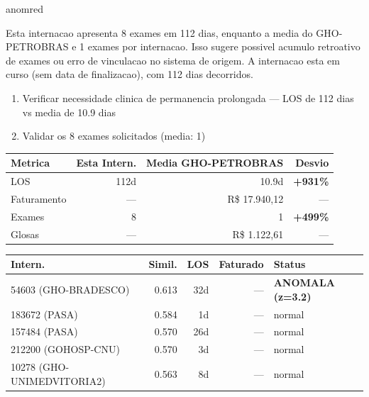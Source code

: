 \documentclass[a4paper,10pt]{article}
\begin{document}
\begin{anomalycard}[Internacao 157279 | GHO-PETROBRAS | CRITICO (z=5.25)]{anomred}
\vspace{2pt}\begin{tcolorbox}[colback=severityred!20,colframe=anomred,title={\textbf{Interpretacao de Negocio}},fonttitle=\bfseries\small,left=4pt,right=4pt,top=3pt,bottom=3pt]
{\small Esta internacao apresenta 8 exames em 112 dias, enquanto a media do GHO-PETROBRAS e 1 exames por internacao. Isso sugere possivel acumulo retroativo de exames ou erro de vinculacao no sistema de origem. A internacao esta em curso (sem data de finalizacao), com 112 dias decorridos.}
\end{tcolorbox}
\begin{tcolorbox}[colback=severityyellow!30,colframe=anomorange,title={\textbf{Recomendacoes Especificas}},fonttitle=\bfseries\small,left=4pt,right=4pt,top=3pt,bottom=3pt]
\begin{enumerate}[nosep,leftmargin=16pt]
\item {\small Verificar necessidade clinica de permanencia prolongada --- LOS de 112 dias vs media de 10.9 dias}
\item {\small Validar os 8 exames solicitados (media: 1)}
\end{enumerate}
\end{tcolorbox}
\begin{center}\begin{tabular}{l r r r}\toprule\textbf{Metrica} & \textbf{Esta Intern.} & \textbf{Media GHO-PETROBRAS} & \textbf{Desvio} \\\midrule
LOS & 112d & 10.9d & \textcolor{anomred}{\textbf{+931\%}} \\
Faturamento & --- & R\$ 17.940,12 & --- \\
Exames & 8 & 1 & \textcolor{anomred}{\textbf{+499\%}} \\
Glosas & --- & R\$ 1.122,61 & --- \\
\bottomrule\end{tabular}\end{center}

\begin{tabular}{l r r r l}\toprule\textbf{Intern.} & \textbf{Simil.} & \textbf{LOS} & \textbf{Faturado} & \textbf{Status} \\\midrule
54603 (GHO-BRADESCO) & 0.613 & 32d & --- & \textcolor{anomred}{\textbf{ANOMALA (z=3.2)}} \\
183672 (PASA) & 0.584 & 1d & --- & \textcolor{jcubeblue}{normal} \\
157484 (PASA) & 0.570 & 26d & --- & \textcolor{jcubeblue}{normal} \\
212200 (GOHOSP-CNU) & 0.570 & 3d & --- & \textcolor{jcubeblue}{normal} \\
10278 (GHO-UNIMEDVITORIA2) & 0.563 & 8d & --- & \textcolor{jcubeblue}{normal} \\
\bottomrule\end{tabular}


\end{anomalycard}
\end{document}
